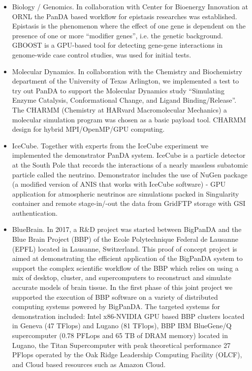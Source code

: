 \begin{itemize}
    \item Biology / Genomics. 
In collaboration with Center for Bioenergy Innovation at ORNL the PanDA based
workflow for epistasis researches was established. Epistasis is the phenomenon
where the effect of one gene is dependent on the presence of one or more
``modifier genes'', i.e. the genetic background. GBOOST \cite{GBOOST} is a
GPU-based tool for detecting gene-gene interactions in genome-wide case control
studies, was used for initial tests.

    \item Molecular Dynamics.
In collaboration with the Chemistry and Biochemistry department of the
University of Texas Arlington, we implemented a test to try out PanDA to
support the Molecular Dynamics study ``Simulating Enzyme Catalysis,
Conformational Change, and Ligand Binding/Release''. The CHARMM (Chemistry at
HARvard Macromolecular Mechanics) \cite{Brooks2009CHARMM} a molecular
simulation program was chosen as a basic payload tool. CHARMM design for hybrid
MPI/OpenMP/GPU computing.

    \item IceCube. 
Together with experts from the IceCube experiment we implemented the
demonstrator PanDA system. IceCube \cite{Halzen:2010yj} is a particle detector
at the South Pole that records the interactions of a nearly massless subatomic
particle called the neutrino. Demonstrator includes the use of NuGen package (a
modified version of ANIS \cite{Gazizov:2004va} that works with IceCube
software) - GPU application for atmospheric neutrinos are simulations packed in
Singularity container and remote stage-in/-out the data from GridFTP
\cite{Allcock:2005:GSG:1105760.1105819} storage with GSI authentication. 

    \item BlueBrain.
In 2017, a R\&D project was started between BigPanDA and the Blue Brain Project
(BBP) \cite{Markram} of the Ecole Polytechnique Federal de Lausanne (EPFL)
located in Lausanne, Switzerland. This proof of concept project is aimed at
demonstrating the efficient application of the BigPanDA system to support the
complex scientific workflow of the BBP which relies on using a mix of desktop,
cluster, and supercomputers to reconstruct and simulate accurate models of
brain tissue. In the first phase of this joint project we supported the
execution of BBP software on a variety of distributed computing systems powered
by BigPanDA. The targeted systems for demonstration included: Intel x86-NVIDIA
GPU based BBP clusters located in Geneva (47 TFlops) and Lugano (81 TFlops),
BBP IBM BlueGene/Q supercomputer \cite{citeulike:472727} (0.78 PFLops and 65 TB
of DRAM memory) located in Lugano, the Titan Supercomputer with peak
theoretical performance 27 PFlops operated by the Oak Ridge Leadership
Computing Facility (OLCF), and Cloud based resources such as Amazon Cloud.


\end{itemize}
